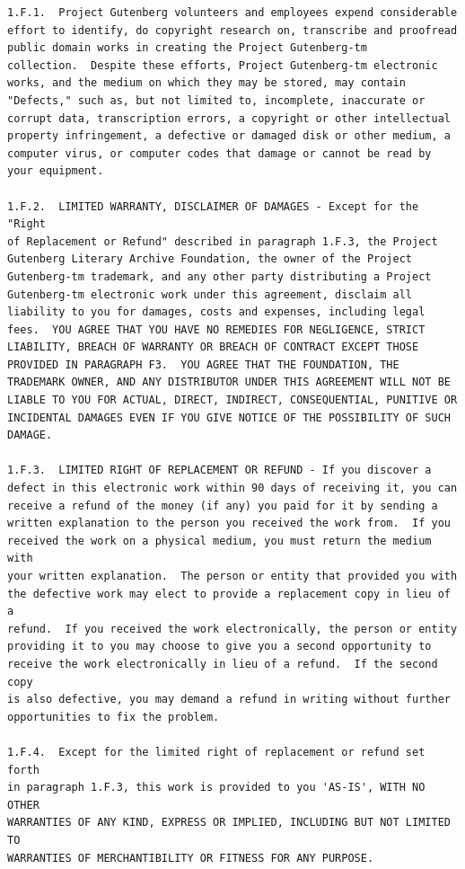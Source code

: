 \documentclass{book}
\begin{document}
\begin{verbatim}
1.F.1.  Project Gutenberg volunteers and employees expend considerable
effort to identify, do copyright research on, transcribe and proofread
public domain works in creating the Project Gutenberg-tm
collection.  Despite these efforts, Project Gutenberg-tm electronic
works, and the medium on which they may be stored, may contain
"Defects," such as, but not limited to, incomplete, inaccurate or
corrupt data, transcription errors, a copyright or other intellectual
property infringement, a defective or damaged disk or other medium, a
computer virus, or computer codes that damage or cannot be read by
your equipment.

1.F.2.  LIMITED WARRANTY, DISCLAIMER OF DAMAGES - Except for the "Right
of Replacement or Refund" described in paragraph 1.F.3, the Project
Gutenberg Literary Archive Foundation, the owner of the Project
Gutenberg-tm trademark, and any other party distributing a Project
Gutenberg-tm electronic work under this agreement, disclaim all
liability to you for damages, costs and expenses, including legal
fees.  YOU AGREE THAT YOU HAVE NO REMEDIES FOR NEGLIGENCE, STRICT
LIABILITY, BREACH OF WARRANTY OR BREACH OF CONTRACT EXCEPT THOSE
PROVIDED IN PARAGRAPH F3.  YOU AGREE THAT THE FOUNDATION, THE
TRADEMARK OWNER, AND ANY DISTRIBUTOR UNDER THIS AGREEMENT WILL NOT BE
LIABLE TO YOU FOR ACTUAL, DIRECT, INDIRECT, CONSEQUENTIAL, PUNITIVE OR
INCIDENTAL DAMAGES EVEN IF YOU GIVE NOTICE OF THE POSSIBILITY OF SUCH
DAMAGE.

1.F.3.  LIMITED RIGHT OF REPLACEMENT OR REFUND - If you discover a
defect in this electronic work within 90 days of receiving it, you can
receive a refund of the money (if any) you paid for it by sending a
written explanation to the person you received the work from.  If you
received the work on a physical medium, you must return the medium with
your written explanation.  The person or entity that provided you with
the defective work may elect to provide a replacement copy in lieu of a
refund.  If you received the work electronically, the person or entity
providing it to you may choose to give you a second opportunity to
receive the work electronically in lieu of a refund.  If the second copy
is also defective, you may demand a refund in writing without further
opportunities to fix the problem.

1.F.4.  Except for the limited right of replacement or refund set forth
in paragraph 1.F.3, this work is provided to you 'AS-IS', WITH NO OTHER
WARRANTIES OF ANY KIND, EXPRESS OR IMPLIED, INCLUDING BUT NOT LIMITED TO
WARRANTIES OF MERCHANTIBILITY OR FITNESS FOR ANY PURPOSE.


\end{verbatim}
\end{document}
